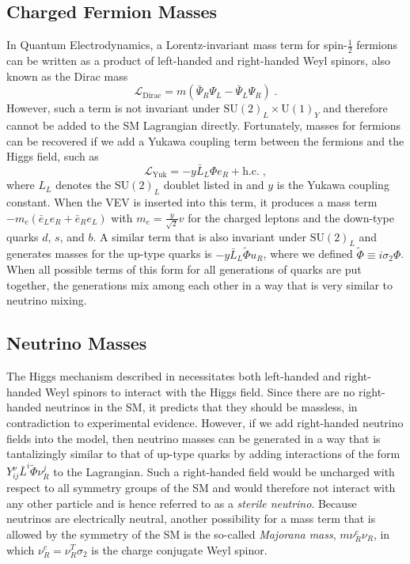 \subsection{Charged Fermion Masses}
\label{sec:charged-fermion-masses}
In Quantum Electrodynamics, a Lorentz-invariant mass term for spin-$\frac{1}{2}$ fermions can be written as a product of left-handed and right-handed Weyl spinors, also known as the Dirac mass
\begin{equation}
    \mathcal{L}_\mathrm{Dirac} = m (\bar{\Psi}_R \Psi_L - \bar{\Psi}_L \Psi_R)\;.
\end{equation}
However, such a term is not invariant under $\mathrm{SU}(2)_L \times \mathrm{U}(1)_Y$ and therefore cannot be added to the SM Lagrangian directly. Fortunately, masses for fermions can be recovered if we add a Yukawa coupling term between the fermions and the Higgs field, such as
\begin{equation}
    \mathcal{L}_\mathrm{Yuk} = -y \bar{L}_L \Phi e_R + \mathrm{h.c.}\;,
\end{equation}
where $L_L$ denotes the $\mathrm{SU}(2)_L$ doublet listed in  and $y$ is the Yukawa coupling constant. When the VEV is inserted into this term, it produces a mass term $-m_e (\bar{e}_L e_R + \bar{e}_R e_L)$ with $m_e = \frac{y}{\sqrt{2}}v$ for the charged leptons and the down-type quarks $d$, $s$, and $b$.  A similar term that is also invariant under $\mathrm{SU}(2)_L$ and generates masses for the up-type quarks is $-y \bar{L}_L \tilde{\Phi} u_R$, where we defined $\tilde{\Phi} \equiv i \sigma_2 \Phi$. When all possible terms of this form for all generations of quarks are put together, the generations mix among each other in a way that is very similar to neutrino mixing.

\subsection{Neutrino Masses}
The Higgs mechanism described in  necessitates both left-handed and right-handed Weyl spinors to interact with the Higgs field. Since there are no right-handed neutrinos in the SM, it predicts that they should be massless, in contradiction to experimental evidence. However, if we add right-handed neutrino fields into the model, then neutrino masses can be generated in a way that is tantalizingly similar to that of up-type quarks by adding interactions of the form $Y_{ij}^\nu \bar{L}^i \tilde{\Phi}\nu_R^j$ to the Lagrangian. Such a right-handed field would be uncharged with respect to all symmetry groups of the SM and would therefore not interact with any other particle and is hence referred to as a \emph{sterile neutrino}. Because neutrinos are electrically neutral, another possibility for a mass term that is allowed by the symmetry of the SM is the so-called \emph{Majorana mass}, $m \nu_R^c \nu_R$, in which $\nu_R^c=\nu_R^T \sigma_2$ is the charge conjugate Weyl spinor.


